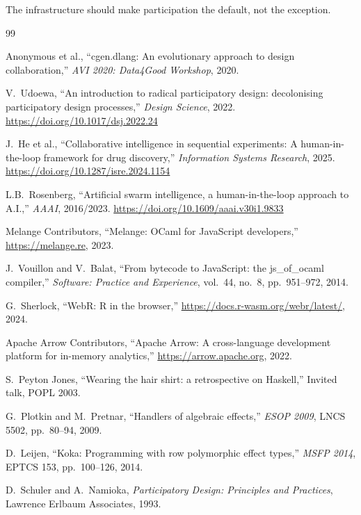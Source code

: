 \documentclass[11pt,letterpaper]{article}
\newcommand{\doi}[1]{\url{https://doi.org/#1}}
\begin{document}
The infrastructure should make participation the default, not the exception.

\begin{thebibliography}{99}

Anonymous et al.,
``cgen.dlang: An evolutionary approach to design collaboration,''
\textit{AVI 2020: Data4Good Workshop}, 2020.

V.~Udoewa,
``An introduction to radical participatory design: decolonising participatory design processes,''
\textit{Design Science}, 2022.
\newblock \doi{10.1017/dsj.2022.24}

J.~He et al.,
``Collaborative intelligence in sequential experiments: A human-in-the-loop framework for drug discovery,''
\textit{Information Systems Research}, 2025.
\newblock \doi{10.1287/isre.2024.1154}

L.B.~Rosenberg,
``Artificial swarm intelligence, a human-in-the-loop approach to A.I.,''
\textit{AAAI}, 2016/2023.
\newblock \doi{10.1609/aaai.v30i1.9833}

Melange Contributors,
``Melange: OCaml for JavaScript developers,''
\url{https://melange.re}, 2023.

J.~Vouillon and V.~Balat,
``From bytecode to JavaScript: the js\_of\_ocaml compiler,''
\textit{Software: Practice and Experience}, vol.~44, no.~8, pp.~951--972, 2014.

G.~Sherlock,
``WebR: R in the browser,''
\url{https://docs.r-wasm.org/webr/latest/}, 2024.

Apache Arrow Contributors,
``Apache Arrow: A cross-language development platform for in-memory analytics,''
\url{https://arrow.apache.org}, 2022.

S.~Peyton Jones,
``Wearing the hair shirt: a retrospective on Haskell,''
Invited talk, POPL 2003.

G.~Plotkin and M.~Pretnar,
``Handlers of algebraic effects,''
\textit{ESOP 2009}, LNCS 5502, pp.~80--94, 2009.

D.~Leijen,
``Koka: Programming with row polymorphic effect types,''
\textit{MSFP 2014}, EPTCS 153, pp.~100--126, 2014.

D.~Schuler and A.~Namioka,
\textit{Participatory Design: Principles and Practices},
Lawrence Erlbaum Associates, 1993.


\end{thebibliography}
\end{document}

